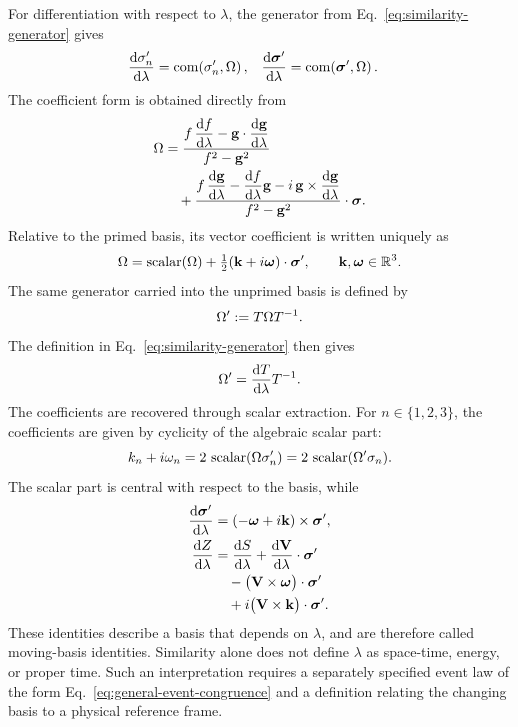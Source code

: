 For differentiation with respect to \(\lambda\), the generator from
Eq.\ \eqref{eq:similarity-generator} gives
\begin{align*}
\frac{\mathrm d\sigma_n'}{\mathrm d\lambda}
&=\operatorname{com}\!\left(\sigma_n',\Omega\right),&
\frac{\mathrm d\mathbf{\bm{\sigma}}'}{\mathrm d\lambda}
&=\operatorname{com}\!\left(\mathbf{\bm{\sigma}}',\Omega\right).
\end{align*}
The coefficient form is obtained directly from
\begin{align*}
\Omega
&=\frac{f\,\dfrac{\mathrm d f}{\mathrm d\lambda}
        -\mathbf{g}\cdot\dfrac{\mathrm d\mathbf{g}}{\mathrm d\lambda}}
        {f^2-\mathbf{g}^2}\\
&\quad+
\frac{f\,\dfrac{\mathrm d\mathbf{g}}{\mathrm d\lambda}
      -\dfrac{\mathrm d f}{\mathrm d\lambda}\mathbf{g}
      -i\,\mathbf{g}\times\dfrac{\mathrm d\mathbf{g}}{\mathrm d\lambda}}
     {f^2-\mathbf{g}^2}\cdot\mathbf{\bm{\sigma}}.
\end{align*}
Relative to the primed basis, its vector coefficient is written uniquely as
\[
\Omega
=\operatorname{scalar}(\Omega)
 +\tfrac12(\mathbf{k}+i\mathbf{\boldsymbol\omega})\cdot\mathbf{\bm{\sigma}}',
\qquad \mathbf{k},\mathbf{\boldsymbol\omega}\in\mathbb{R}^3.
\]
The same generator carried into the unprimed basis is defined by
\begin{equation}
\Omega':=T\Omega T^{-1}.
\label{eq:carried-similarity-generator}
\end{equation}
The definition in Eq.\ \eqref{eq:similarity-generator} then gives
\[
\Omega'=\frac{\mathrm dT}{\mathrm d\lambda}T^{-1}.
\]
The coefficients are recovered through scalar extraction.
For \(n\in\{1,2,3\}\), the coefficients are given by cyclicity of the
algebraic scalar part:
\[
k_n+i\omega_n
=2\,\operatorname{scalar}(\Omega\sigma_n')
=2\,\operatorname{scalar}(\Omega'\sigma_n).
\]
The scalar part is central with respect to the basis, while
\begin{align*}
\frac{\mathrm d\mathbf{\bm{\sigma}}'}{\mathrm d\lambda}
&=(-\mathbf{\boldsymbol\omega}+i\mathbf{k})\times\mathbf{\bm{\sigma}}',\\
\frac{\mathrm dZ}{\mathrm d\lambda}
&=\frac{\mathrm d S}{\mathrm d\lambda}
 +\frac{\mathrm d\mathbf{V}}{\mathrm d\lambda}\cdot\mathbf{\bm{\sigma}}'\notag\\
&\quad-\bigl(\mathbf{V}\times\mathbf{\boldsymbol\omega}\bigr)\cdot\mathbf{\bm{\sigma}}'\notag\\
&\quad+i\bigl(\mathbf{V}\times\mathbf{k}\bigr)\cdot\mathbf{\bm{\sigma}}'.
\end{align*}
These identities describe a basis that depends on \(\lambda\), and are
therefore called moving-basis identities. Similarity alone does not define
\(\lambda\) as space-time, energy, or proper time. Such an interpretation
requires a separately specified event law of the form
Eq.\ \eqref{eq:general-event-congruence} and a definition relating the
changing basis to a physical reference frame.

